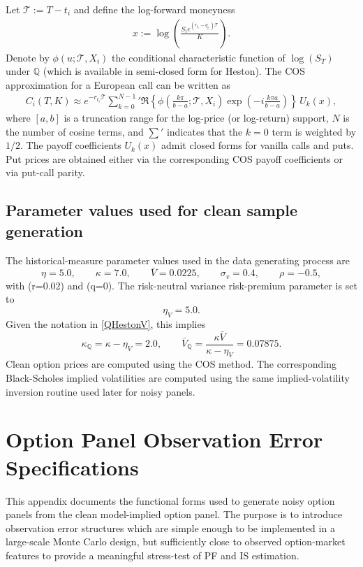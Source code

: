 \documentclass[11pt,a4paper,notitlepage]{article}
\numberwithin{equation}{section}
\begin{document}
Let $\mathcal T:=T-t_i$ and define the log-forward moneyness
\begin{align}
x:=\log\!\left(\frac{S_i e^{(r_{t_i}-q_{t_i})\mathcal T}}{K}\right).
\end{align}
Denote by $\phi(u;\mathcal T,X_i)$ the conditional characteristic function of $\log(S_T)$ under $\mathbb{Q}$
(which is available in semi-closed form for Heston). The COS approximation for a European call can be
written as
\begin{align}
C_i(T,K) \approx e^{-r_{t_i}\mathcal T}\sum_{k=0}^{N-1}{}'
\Re\!\left\{\phi\!\left(\frac{k\pi}{b-a};\mathcal T,X_i\right)\exp\!\left(-i\frac{k\pi a}{b-a}\right)\right\}
\,U_k(x),
\label{eq:COS_call}
\end{align}
where $[a,b]$ is a truncation range for the log-price (or log-return) support, $N$ is the number of cosine
terms, and $\sum'$ indicates that the $k=0$ term is weighted by $1/2$. The payoff coefficients $U_k(x)$
admit closed forms for vanilla calls and puts. Put prices are obtained either via the corresponding COS payoff
coefficients or via put-call parity.


\subsection{Parameter values used for clean sample generation}

The historical-measure parameter values used in the data generating process are
\[
\eta=5.0,\qquad
\kappa=7.0,\qquad
\bar V=0.0225,\qquad
\sigma_v=0.4,\qquad
\rho=-0.5,
\]
with (r=0.02) and (q=0). The risk-neutral variance risk-premium parameter is set to
\[
\eta_V=5.0.
\]
Given the notation in \eqref{QHestonV}, this implies
\[
\kappa_{\mathbb Q}=\kappa-\eta_V=2.0,
\qquad
\bar V_{\mathbb Q}=\frac{\kappa\bar V}{\kappa-\eta_V}=0.07875.
\]
Clean option prices are computed using the COS method. The corresponding Black-Scholes implied volatilities are computed using the same implied-volatility inversion routine used later for noisy panels.

\section{Option Panel Observation Error Specifications}
\label{app:option_noise_specs}

This appendix documents the functional forms used to generate noisy option panels from the clean model-implied option panel. The purpose is to introduce observation error structures which are simple enough to be implemented in a large-scale Monte Carlo design, but sufficiently close to observed option-market features to provide a meaningful stress-test of PF and IS estimation.
\end{document}
